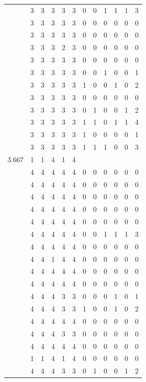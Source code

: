 \documentclass[]{msu-thesis}
\theoremstyle{definition}
\theoremstyle{definition}
\theoremstyle{definition}
\theoremstyle{remark}
\begin{document}
\begin{table}
{\begin{tabular}[t]{rrrrrrrrrrrr}
 & 3 & 3 & 3 & 3 & 3 & 0 & 0 & 1 & 1 & 1 & 3\\
 & 3 & 3 & 3 & 3 & 3 & 0 & 0 & 0 & 0 & 0 & 0\\
 & 3 & 3 & 3 & 3 & 3 & 0 & 0 & 0 & 0 & 0 & 0\\
 & 3 & 3 & 3 & 2 & 3 & 0 & 0 & 0 & 0 & 0 & 0\\
 & 3 & 3 & 3 & 3 & 3 & 0 & 0 & 0 & 0 & 0 & 0\\
 & 3 & 3 & 3 & 3 & 3 & 0 & 0 & 1 & 0 & 0 & 1\\
 & 3 & 3 & 3 & 3 & 3 & 1 & 0 & 0 & 1 & 0 & 2\\
 & 3 & 3 & 3 & 3 & 3 & 0 & 0 & 0 & 0 & 0 & 0\\
 & 3 & 3 & 3 & 3 & 3 & 0 & 1 & 0 & 0 & 1 & 2\\
 & 3 & 3 & 3 & 3 & 3 & 1 & 1 & 0 & 1 & 1 & 4\\
 & 3 & 3 & 3 & 3 & 3 & 1 & 0 & 0 & 0 & 0 & 1\\
 & 3 & 3 & 3 & 3 & 3 & 1 & 1 & 1 & 0 & 0 & 3\\
3.667 & 1 & 1 & 4 & 1 & 4 &  &  &  &  &  & \\
 & 4 & 4 & 4 & 4 & 4 & 0 & 0 & 0 & 0 & 0 & 0\\
 & 4 & 4 & 4 & 4 & 4 & 0 & 0 & 0 & 0 & 0 & 0\\
 & 4 & 4 & 4 & 4 & 4 & 0 & 0 & 0 & 0 & 0 & 0\\
 & 4 & 4 & 4 & 4 & 4 & 0 & 0 & 0 & 0 & 0 & 0\\
 & 4 & 4 & 4 & 4 & 4 & 0 & 0 & 0 & 0 & 0 & 0\\
 & 4 & 4 & 4 & 4 & 4 & 0 & 0 & 1 & 1 & 1 & 3\\
 & 4 & 4 & 4 & 4 & 4 & 0 & 0 & 0 & 0 & 0 & 0\\
 & 4 & 4 & 1 & 4 & 4 & 0 & 0 & 0 & 0 & 0 & 0\\
 & 4 & 4 & 4 & 4 & 4 & 0 & 0 & 0 & 0 & 0 & 0\\
 & 4 & 4 & 4 & 4 & 4 & 0 & 0 & 0 & 0 & 0 & 0\\
 & 4 & 4 & 4 & 3 & 3 & 0 & 0 & 0 & 1 & 0 & 1\\
 & 4 & 4 & 4 & 3 & 3 & 1 & 0 & 0 & 1 & 0 & 2\\
 & 4 & 4 & 4 & 4 & 4 & 0 & 0 & 0 & 0 & 0 & 0\\
 & 4 & 4 & 4 & 3 & 3 & 0 & 0 & 0 & 0 & 0 & 0\\
 & 4 & 4 & 4 & 4 & 4 & 0 & 0 & 0 & 0 & 0 & 0\\
 & 1 & 1 & 4 & 1 & 4 & 0 & 0 & 0 & 0 & 0 & 0\\
 & 4 & 4 & 4 & 3 & 3 & 0 & 1 & 0 & 0 & 1 & 2\\

\end{tabular}}
\end{table}
\end{document}
